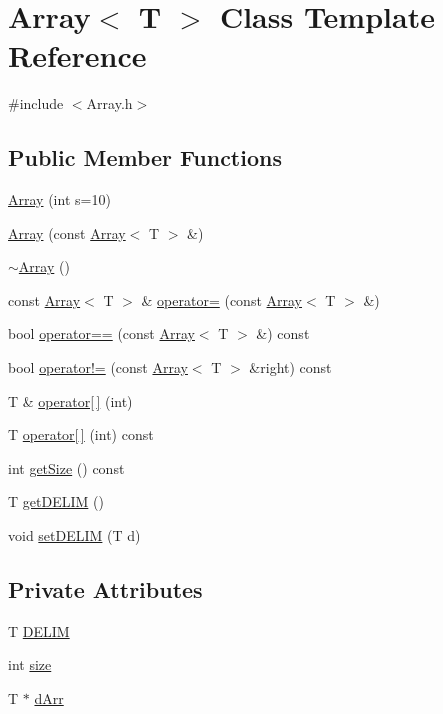 \hypertarget{classArray}{}\section{Array$<$ T $>$ Class Template Reference}
\label{classArray}


{\ttfamily \#include $<$Array.\+h$>$}

\subsection*{Public Member Functions}
\begin{DoxyCompactItemize}
\item 
\hyperlink{classArray_a7503e793980e6d3d5e978fa106a825c2}{Array} (int s=10)
\item 
\hyperlink{classArray_ae9c29e5733413ed09e9137f3c8a71d04}{Array} (const \hyperlink{classArray}{Array}$<$ T $>$ \&)
\item 
\hyperlink{classArray_aab89a85b1ddb86864096acdcc0db439e}{$\sim$\+Array} ()
\item 
const \hyperlink{classArray}{Array}$<$ T $>$ \& \hyperlink{classArray_a0bfa1f9daf4923f45cef66ed086316d7}{operator=} (const \hyperlink{classArray}{Array}$<$ T $>$ \&)
\item 
bool \hyperlink{classArray_ad0fb0f6e80dde0d5e293ae6cfd185ee6}{operator==} (const \hyperlink{classArray}{Array}$<$ T $>$ \&) const 
\item 
bool \hyperlink{classArray_a6f725ca34538a7dc52d097f6c3223a43}{operator!=} (const \hyperlink{classArray}{Array}$<$ T $>$ \&right) const 
\item 
T \& \hyperlink{classArray_a5bae7a87802dbc12faf74956e240c0b2}{operator\mbox{[}$\,$\mbox{]}} (int)
\item 
T \hyperlink{classArray_a0628bf2b0fcd81749659bcc0e2caf0e1}{operator\mbox{[}$\,$\mbox{]}} (int) const 
\item 
int \hyperlink{classArray_a88b824f494fefe7053adf4a5cf55e7cf}{get\+Size} () const 
\item 
T \hyperlink{classArray_aa9850f94775a80016a6ef59e76dac02d}{get\+D\+E\+L\+IM} ()
\item 
void \hyperlink{classArray_aebe3687021d31102a7d52e18bedbffbc}{set\+D\+E\+L\+IM} (T d)
\end{DoxyCompactItemize}
\subsection*{Private Attributes}
\begin{DoxyCompactItemize}
\item 
T \hyperlink{classArray_ab425400868a291283a14fc228a344bf0}{D\+E\+L\+IM}
\item 
int \hyperlink{classArray_a1e2031821065f3fb9bfada13e2d6ab43}{size}
\item 
T $\ast$ \hyperlink{classArray_ae2ca81aaef91da786ef75936184a178a}{d\+Arr}
\end{DoxyCompactItemize}
